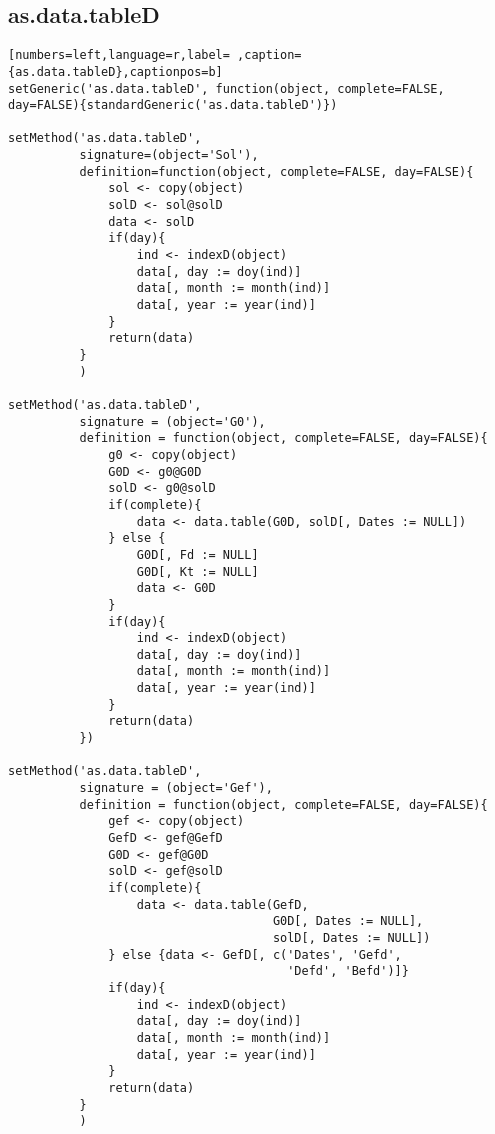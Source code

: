 \subsection{as.data.tableD}
\label{sec:orgd5c3fab}
\begin{lstlisting}[numbers=left,language=r,label= ,caption={as.data.tableD},captionpos=b]
setGeneric('as.data.tableD', function(object, complete=FALSE, day=FALSE){standardGeneric('as.data.tableD')})

setMethod('as.data.tableD',
          signature=(object='Sol'),
          definition=function(object, complete=FALSE, day=FALSE){
              sol <- copy(object)
              solD <- sol@solD
              data <- solD
              if(day){
                  ind <- indexD(object)
                  data[, day := doy(ind)]
                  data[, month := month(ind)]
                  data[, year := year(ind)]
              }
              return(data)
          }
          )

setMethod('as.data.tableD',
          signature = (object='G0'),
          definition = function(object, complete=FALSE, day=FALSE){
              g0 <- copy(object)
              G0D <- g0@G0D
              solD <- g0@solD
              if(complete){
                  data <- data.table(G0D, solD[, Dates := NULL])
              } else {
                  G0D[, Fd := NULL]
                  G0D[, Kt := NULL]
                  data <- G0D
              }
              if(day){
                  ind <- indexD(object)
                  data[, day := doy(ind)]
                  data[, month := month(ind)]
                  data[, year := year(ind)]
              }
              return(data)
          })

setMethod('as.data.tableD',
          signature = (object='Gef'),
          definition = function(object, complete=FALSE, day=FALSE){
              gef <- copy(object)
              GefD <- gef@GefD
              G0D <- gef@G0D
              solD <- gef@solD
              if(complete){
                  data <- data.table(GefD,
                                     G0D[, Dates := NULL],
                                     solD[, Dates := NULL])
              } else {data <- GefD[, c('Dates', 'Gefd',
                                       'Defd', 'Befd')]}
              if(day){
                  ind <- indexD(object)
                  data[, day := doy(ind)]
                  data[, month := month(ind)]
                  data[, year := year(ind)]     
              }
              return(data)
          }
          )


\end{lstlisting}
